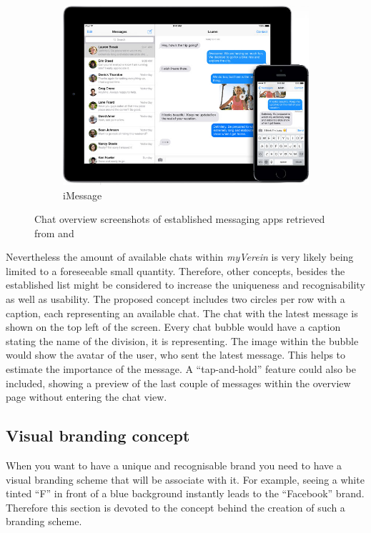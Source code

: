 \begin{figure}[h]
\begin{subfigure}{.66\textwidth}
  		\includegraphics[width=0.98\linewidth]{./images/imessage-screen.jpg}
  		\caption{iMessage}
  		\label{fig:ChatiMessage}
	\end{subfigure}
	\caption{Chat overview screenshots of established messaging apps retrieved from \cite{Inc.:2015aa} and \cite{Stuckler:2013aa}}
	\label{fig:ChatScreens}
\end{figure}
\nocite{Inc.:2015aa, Stuckler:2013aa}

Nevertheless the amount of available chats within \emph{myVerein} is very likely being limited to a foreseeable small quantity. Therefore, other concepts, besides the established list might be considered to increase the uniqueness and recognisability as well as usability. The proposed concept includes two circles per row with a caption, each representing an available chat. The chat with the latest message is shown on the top left of the screen. Every chat bubble would have a caption stating the name of the division, it is representing. The image within the bubble would show the avatar of the user, who sent the latest message. This helps to estimate the importance of the message. A \enquote{tap-and-hold} feature could also be included, showing a preview of the last couple of messages within the overview page without entering the chat view.

\subsection{Visual branding concept}
\label{sec:BrandingConcept}

When you want to have a unique and recognisable brand you need to have a visual branding scheme that will be associate with it. For example, seeing a white tinted \enquote{F} in front of a blue background instantly leads to the \enquote{Facebook} brand. Therefore this section is devoted to the concept behind the creation of such a branding scheme. 

